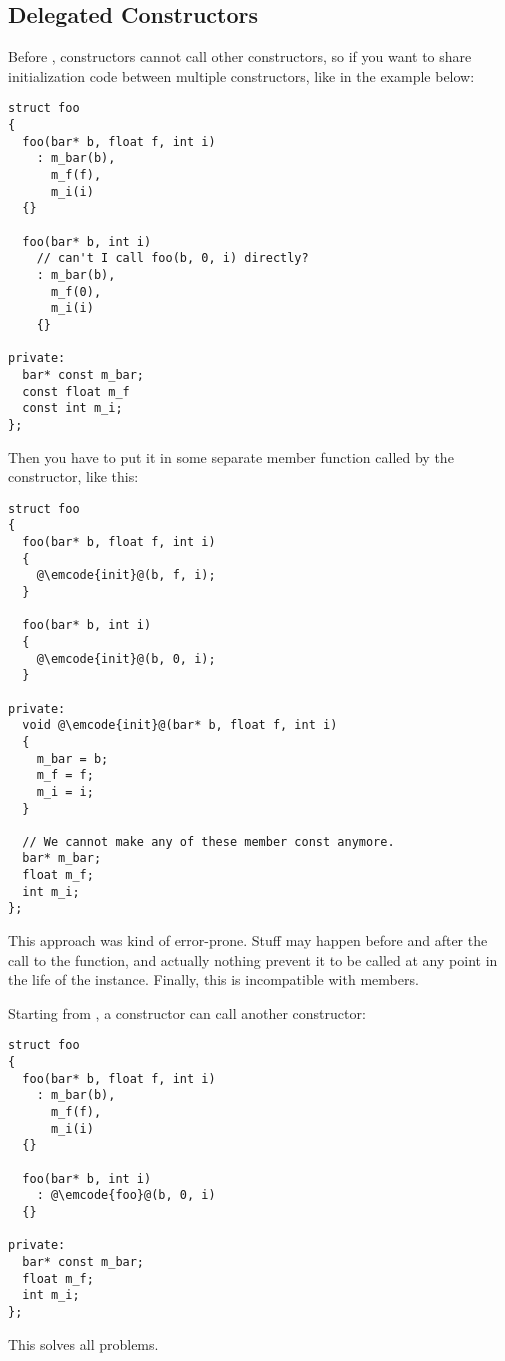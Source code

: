 \subsection{Delegated Constructors}

Before , constructors cannot call other constructors, so if you
want to share initialization code between multiple constructors,
like in the example below:

\begin{lstlisting}
struct foo
{
  foo(bar* b, float f, int i)
    : m_bar(b),
      m_f(f),
      m_i(i)
  {}
  
  foo(bar* b, int i)
    // can't I call foo(b, 0, i) directly?
    : m_bar(b),
      m_f(0),
      m_i(i)
    {}

private:
  bar* const m_bar;
  const float m_f
  const int m_i;
};
\end{lstlisting}

Then you have to put it in some separate member function called by the
constructor, like this:

\begin{lstlisting}
struct foo
{
  foo(bar* b, float f, int i)
  {
    @\emcode{init}@(b, f, i);
  }
  
  foo(bar* b, int i)
  {
    @\emcode{init}@(b, 0, i);
  }

private:
  void @\emcode{init}@(bar* b, float f, int i)
  {
    m_bar = b;
    m_f = f;
    m_i = i;
  }

  // We cannot make any of these member const anymore.
  bar* m_bar;
  float m_f;  
  int m_i;
};
\end{lstlisting}

This approach was kind of error-prone. Stuff may happen before and
after the call to the  function, and actually nothing
prevent it to be called at any point in the life of the
instance. Finally, this is incompatible with  members.

Starting from , a constructor can call another constructor:

\begin{lstlisting}
struct foo
{
  foo(bar* b, float f, int i)
    : m_bar(b),
      m_f(f),
      m_i(i)
  {}
  
  foo(bar* b, int i)
    : @\emcode{foo}@(b, 0, i)
  {}

private:
  bar* const m_bar;
  float m_f;
  int m_i;
};
\end{lstlisting}

This solves all problems.
